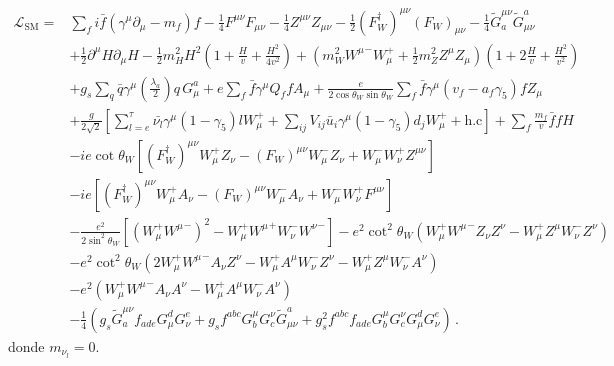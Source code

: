 \begin{align}
  \label{eq:234}
   \mathcal{L}_{\text{SM}}=&\sum_f i\bar{f}\left(\gamma^\mu\partial_\mu-m_f\right)f
-\tfrac{1}{4}F^{\mu\nu} F_{\mu\nu}-\tfrac{1}{4}Z^{\mu\nu} Z_{\mu\nu}-\tfrac{1}{2}(F_W^\dagger)^{\mu\nu} (F_W)_{\mu\nu}
- \tfrac{1}{4}\widetilde{G}^{\mu\nu}_a \widetilde{G}_{\mu\nu}^a\nonumber\\
&+\tfrac{1}{2}\partial^\mu H\partial_\mu H
-\frac{1}{2}m_H^2H^2\left(1+\frac{H}{v}+\frac{H^2}{4v^2}\right)
+\left(m_W^2{W^\mu}^-W_\mu^++\frac{1}{2}m_Z^2Z^\mu Z_\mu\right)\left(1+2\frac{H}{v}+\frac{H^2}{v^2}\right)\nonumber\\
&+g_s\sum_q\bar{q}\gamma^\mu\left(\frac{\lambda_a}{2}\right)q\,G_\mu^a+e\sum_f \bar{f}\gamma^\mu Q_f f A_\mu+\frac{e}{2\cos\theta_W\sin\theta_W}\sum_{f}\bar{f}\gamma^\mu(v_f-a_f\gamma_5)f Z_\mu\nonumber\\
&+\frac{g}{2\sqrt{2}}\left[\sum_{l=e}^{\tau}\bar{\nu_l}\gamma^\mu(1-\gamma_5)l W_\mu^++\sum_{ij}V_{ij}\bar{u}_i\gamma^\mu(1-\gamma_5)d_j W_\mu^++\text{h.c}\right]
+\sum_f \frac{m_f}{v} \bar{f}f H\nonumber\\
&-ie\cot\theta_W\left[(F_W^\dagger)^{\mu\nu}W_\mu^+ Z_\nu-(F_W)^{\mu\nu}W_\mu^- Z_\nu+W_\mu^-W_\nu^+Z^{\mu\nu}\right]\nonumber\\
&-ie\left[(F_W^\dagger)^{\mu\nu}W_\mu^+ A_\nu-(F_W)^{\mu\nu}W_\mu^- A_\nu+W_\mu^-W_\nu^+F^{\mu\nu}\right]\nonumber\\
&-\frac{e^2}{2\sin^2\theta_W}\left[\left(W_\mu^+{W^\mu}^-\right)^2-W_\mu^+{W^\mu}^+W_\nu^-{W^\nu}^-\right]
-e^2\cot^2\theta_W\left(W_\mu^+{W^\mu}^-Z_\nu Z^\nu-W_\mu^+Z^\mu W_\nu^-Z^\nu\right)\nonumber\\
&-e^2\cot^2\theta_W\left(2W_\mu^+{W^\mu}^-A_\nu Z^\nu-W_\mu^+A^\mu W_\nu^-Z^\nu-W_\mu^+Z^\mu W_\nu^-A^\nu\right)\nonumber\\
&-e^2\left(W_\mu^+{W^\mu}^-A_\nu A^\nu-W_\mu^+A^\mu W_\nu^-A^\nu\right)\nonumber\\
&- \frac{1}{4}\left(g_s\widetilde{G}^{\mu\nu}_af_{a d e}G^d_\mu G^e_\nu
    +g_sf^{a b c}G_b^\mu G_c^\nu\widetilde{G}_{\mu\nu}^a
    +g_s^2f^{a b c}f_{a d e}G_b^\mu G_c^\nu G^d_\mu G^e_\nu\right)\,.
\end{align}
donde $m_{\nu_l}=0$.

